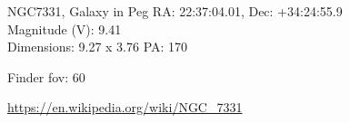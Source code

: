\begin{block}{NGC7331, Galaxy in Peg}
    RA: 22:37:04.01, Dec: +34:24:55.9 \\ 
    Magnitude (V): 9.41 \\ 
    Dimensions: 9.27 x 3.76 PA: 170 

    Finder fov: 60 

    \url{https://en.wikipedia.org/wiki/NGC_7331} 
\end{block}